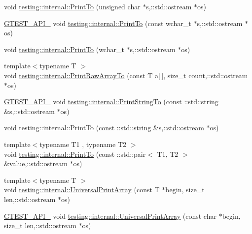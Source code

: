 \begin{DoxyCompactItemize}
void \hyperlink{namespacetesting_1_1internal_a10f8d85ee591c315557372669c02fbb7}{testing\-::internal\-::\-Print\-To} (unsigned char $\ast$s,\-::std\-::ostream $\ast$os)
\item 
\hyperlink{gtest-port_8h_aa73be6f0ba4a7456180a94904ce17790}{G\-T\-E\-S\-T\-\_\-\-A\-P\-I\-\_\-} void \hyperlink{namespacetesting_1_1internal_a9f0cce661c0cff119402169bb08131fa}{testing\-::internal\-::\-Print\-To} (const wchar\-\_\-t $\ast$s,\-::std\-::ostream $\ast$os)
\item 
void \hyperlink{namespacetesting_1_1internal_a43ae763e7cd5602ebbd9bdc5884203f0}{testing\-::internal\-::\-Print\-To} (wchar\-\_\-t $\ast$s,\-::std\-::ostream $\ast$os)
\item 
{\footnotesize template$<$typename T $>$ }\\void \hyperlink{namespacetesting_1_1internal_aba630c2fa49dd2b4bce3de24e70aec9f}{testing\-::internal\-::\-Print\-Raw\-Array\-To} (const T a\mbox{[}$\,$\mbox{]}, size\-\_\-t count,\-::std\-::ostream $\ast$os)
\item 
\hyperlink{gtest-port_8h_aa73be6f0ba4a7456180a94904ce17790}{G\-T\-E\-S\-T\-\_\-\-A\-P\-I\-\_\-} void \hyperlink{namespacetesting_1_1internal_a0b11505e1a4527c1f1d8c1c5cdfb71b5}{testing\-::internal\-::\-Print\-String\-To} (const \-::std\-::string \&s,\-::std\-::ostream $\ast$os)
\item 
void \hyperlink{namespacetesting_1_1internal_a1bcff7765fb78cedada8d09f7159ab7e}{testing\-::internal\-::\-Print\-To} (const \-::std\-::string \&s,\-::std\-::ostream $\ast$os)
\item 
{\footnotesize template$<$typename T1 , typename T2 $>$ }\\void \hyperlink{namespacetesting_1_1internal_a5759c5abed8ebab0e1a8a0f8aadab768}{testing\-::internal\-::\-Print\-To} (const \-::std\-::pair$<$ T1, T2 $>$ \&value,\-::std\-::ostream $\ast$os)
\item 
{\footnotesize template$<$typename T $>$ }\\void \hyperlink{namespacetesting_1_1internal_a73b5046a2ed65d0e2fb7cdc9bdaee3fe}{testing\-::internal\-::\-Universal\-Print\-Array} (const T $\ast$begin, size\-\_\-t len,\-::std\-::ostream $\ast$os)
\item 
\hyperlink{gtest-port_8h_aa73be6f0ba4a7456180a94904ce17790}{G\-T\-E\-S\-T\-\_\-\-A\-P\-I\-\_\-} void \hyperlink{namespacetesting_1_1internal_a3fac293aeb6e7e6b3ff3e27404f6588b}{testing\-::internal\-::\-Universal\-Print\-Array} (const char $\ast$begin, size\-\_\-t len,\-::std\-::ostream $\ast$os)
\item 

\end{DoxyCompactItemize}
